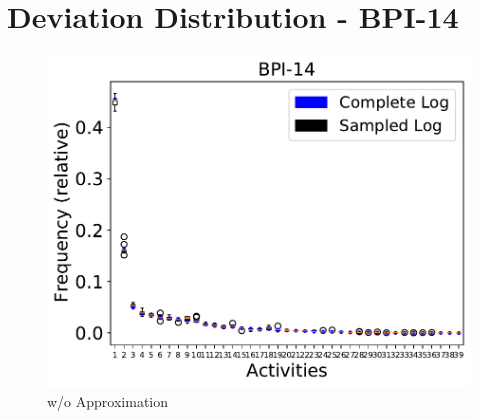 \documentclass[landscape]{article}
\begin{document}
\section*{Deviation Distribution - BPI-14}
\begin{figure}[!htb]
	\centering
	\begin{minipage}{0.2\textwidth}
		\includegraphics[width=1.0\textwidth]{../Detail_Incident_Activity/Detail_Incident_Activity_deviations.pdf}
		\caption{w/o Approximation}
	\end{minipage}
\end{figure}
\end{document}

